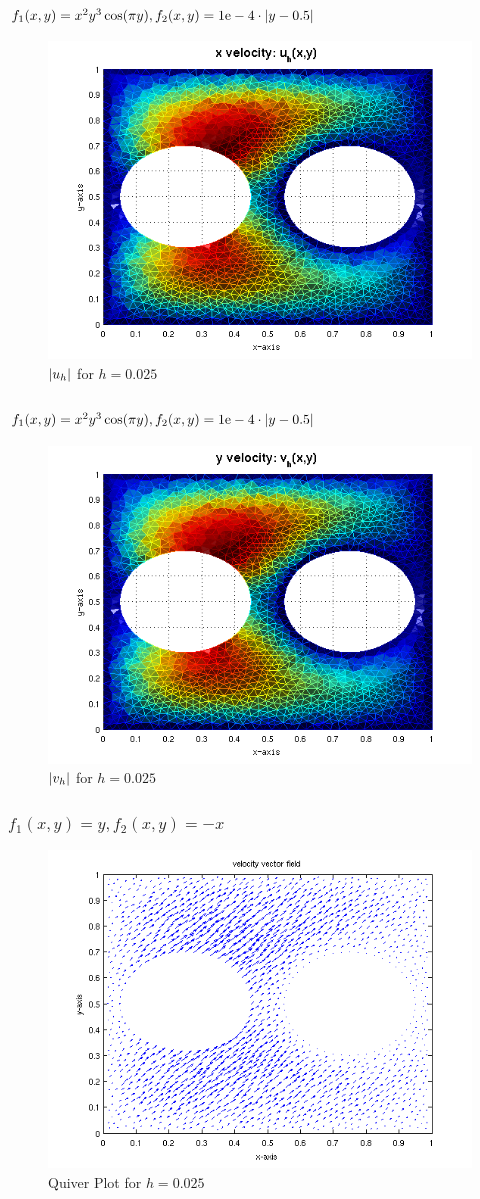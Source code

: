 \documentclass{beamer}
\begin{document}
\begin{frame}
    \frametitle{$f_1(x,y) = x^2 y^3 \cos(\pi y), f_2(x,y) = 1\text{e}-4 \cdot
    \left|y - 0.5\right|$}
\begin{figure}
\includegraphics[width=0.5\linewidth]{./magu_3.png}
\caption{$\left|u_h\right|$ for $h=0.025$}
\end{figure}
\end{frame}

\begin{frame}
    \frametitle{$f_1(x,y) = x^2 y^3 \cos(\pi y), f_2(x,y) = 1\text{e}-4 \cdot
    \left|y - 0.5\right|$}
\begin{figure}
\includegraphics[width=0.5\linewidth]{./magv_3.png}
\caption{$\left|v_h\right|$ for $h=0.025$}
\end{figure}
\end{frame}

\begin{frame}
    \frametitle{$f_1(x,y) = y, f_2(x,y) = -x$}
\begin{figure}
\includegraphics[width=0.5\linewidth]{./q3.png}
\caption{Quiver Plot for $h=0.025$}
\end{figure}
\end{frame}
\end{document}
